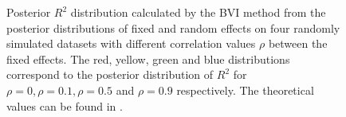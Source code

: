 \begin{figure}[H]
  \centering
  \hfill
  \caption{Posterior $R^2$ distribution calculated by the BVI method from the posterior distributions of fixed and random effects on four randomly simulated datasets with different correlation values $\rho$ between the fixed effects. The red, yellow, green and blue distributions correspond to the posterior distribution of $R^2$ for $\rho=0, \rho=0.1, \rho=0.5$ and $\rho=0.9$ respectively. The theoretical values can be found in .}
  \label{fig:R2}
\end{figure}



